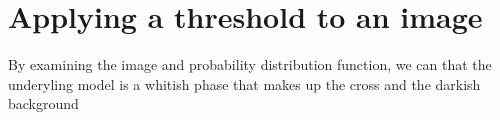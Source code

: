 \documentclass[letterpaper,10pt,english]{sphinxmanual}
\begin{document}
\begin{sphinxVerbatim}[commandchars=\\\{\}]
   
 
  
\end{sphinxVerbatim}

\noindent{}


\section{Applying a threshold to an image}
\label{\detokenize{04-BasicSegmentation:applying-a-threshold-to-an-image}}
\sphinxAtStartPar
By examining the image and probability distribution function, we can  that the underyling model is a whitish phase that makes up the cross and the darkish background
\end{document}
